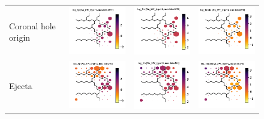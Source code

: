 \documentclass[utf8]{frontiersSCNS} %
\begin{document}
\begin{figure}[h!]
\begin{tabular}{m{2.5cm}CCC}
		Coronal hole origin & \includegraphics[width=4.5cm]{Amaya/SWtype-Xu_SW_type-1-log_Sp} &
		\includegraphics[width=4.5cm]{Amaya/SWtype-Xu_SW_type-1-log_Va} &
		\includegraphics[width=4.5cm]{Amaya/SWtype-Xu_SW_type-1-log_Tratio} \hfill	\\
		
		Ejecta & \includegraphics[width=4.5cm]{Amaya/SWtype-Xu_SW_type-2-log_Sp} &
		\includegraphics[width=4.5cm]{Amaya/SWtype-Xu_SW_type-2-log_Va} &
		\includegraphics[width=4.5cm]{Amaya/SWtype-Xu_SW_type-2-log_Tratio} \hfill	\\
		

\end{tabular}
\end{figure}
\end{document}

